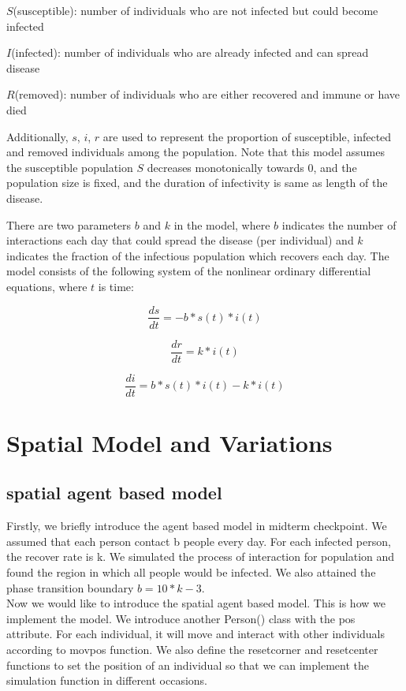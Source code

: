\documentclass{article}
\begin{document}
$S$(susceptible): number of individuals who are not infected but could become infected

$I$(infected): number of individuals who are already infected and can spread disease

$R$(removed): number of individuals who are either recovered and immune or have died

Additionally, $s$, $i$, $r$ are used to represent the proportion of susceptible, infected and removed individuals among the population. Note that this model assumes the susceptible population $S$ decreases monotonically towards 0, and the population size is fixed, and the duration of infectivity is same as length of the disease.

There are two parameters $b$ and $k$ in the model, where $b$ indicates the number of interactions each day that could spread the disease (per individual) and $k$ indicates the fraction of the infectious population which recovers each day. The model consists of the following system of the nonlinear ordinary differential equations, where $t$ is time:

$$\frac{ds}{dt} = -b * s(t) * i(t)$$

$$\frac{dr}{dt} = k * i(t)$$

$$\frac{di}{dt} = b * s(t) * i(t) - k * i(t)$$


\section{Spatial Model and Variations}
\subsection{spatial agent based model}
Firstly, we briefly introduce the agent based model in midterm checkpoint. We assumed that each person contact b people every day. For each infected person, the recover rate is k. We simulated the process of interaction for population and found the region in which all people would be infected. We also attained the phase transition boundary $b = 10*k - 3$.\\

Now we would like to introduce the spatial agent based model. This is how we implement the model. We introduce another Person() class with the pos attribute. For each individual, it will move and interact with other individuals according to movpos function. We also define the resetcorner and resetcenter functions to set the position of an individual so that we can implement the simulation function in different occasions.\\
\end{document}
